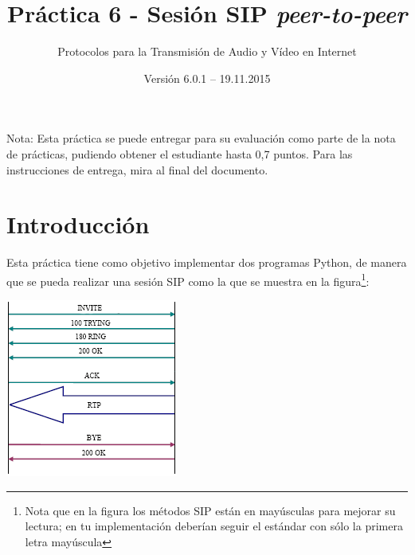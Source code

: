 \documentclass[a4paper,11pt]{article}
\begin{document}
\title{Práctica 6 - Sesión SIP \emph{peer-to-peer}}
\author{Protocolos para la Transmisión de Audio y Vídeo en Internet}
\date{Versión 6.0.1 – 19.11.2015}



\maketitle
\thispagestyle{empty}



Nota: Esta práctica se puede entregar para su evaluación como parte de la nota de prácticas, pudiendo obtener el estudiante hasta 0,7 puntos. Para las instrucciones de entrega, mira al final del documento.

\section*{Introducción}

Esta práctica tiene como objetivo implementar dos programas Python,
de manera que se pueda realizar una sesión SIP como la que se
muestra en la figura\footnote{Nota que en la figura los métodos SIP están en 
mayúsculas para mejorar su lectura; en tu implementación deberían seguir el 
estándar con sólo la primera letra mayúscula}:

\begin{center}
\includegraphics{figs/sip-invite.png}
\end{center}
\end{document}
